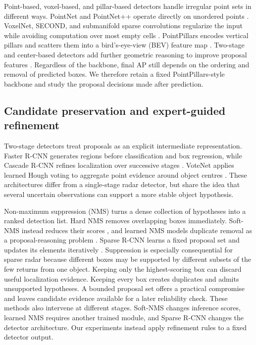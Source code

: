 \documentclass[sensors,article,submit,pdftex,moreauthors]{Definitions/mdpi}
\begin{document}
Point-based, voxel-based, and pillar-based detectors handle irregular point
sets in different ways. PointNet and PointNet++ operate directly on unordered
points \cite{qi2017pointnet,qi2017pointnetpp}. VoxelNet, SECOND, and submanifold
sparse convolutions regularize the input while avoiding computation over most
empty cells \cite{zhou2018voxelnet,yan2018second,graham2018submanifold}.
PointPillars encodes vertical pillars and scatters them into a bird's-eye-view
(BEV) feature map \cite{lang2019pointpillars}. Two-stage and center-based
detectors add further geometric reasoning to improve proposal features
\cite{shi2019pointrcnn,shi2020pvrcnn,yin2021centerpoint}. Regardless of the
backbone, final AP still depends on the ordering and removal of predicted boxes.
We therefore retain a fixed PointPillars-style backbone and study the proposal
decisions made after prediction.

\subsection{Candidate preservation and expert-guided refinement}

Two-stage detectors treat proposals as an explicit intermediate
representation. Faster R-CNN generates regions before classification and box
regression, while Cascade R-CNN refines localization over successive stages
\cite{ren2017fasterrcnn,cai2018cascadercnn}. VoteNet applies learned Hough
voting to aggregate point evidence around object centres
\cite{qi2019votenet}. These architectures differ from a single-stage radar
detector, but share the idea that several uncertain observations can support a
more stable object hypothesis.

Non-maximum suppression (NMS) turns a dense collection of hypotheses into a
ranked detection list. Hard NMS removes overlapping boxes immediately.
Soft-NMS instead reduces their scores \cite{bodla2017softnms}, and learned NMS
models duplicate removal as a proposal-reasoning problem
\cite{hosang2017learnnms}. Sparse R-CNN learns a fixed proposal set and updates
its elements iteratively \cite{sun2021sparsercnn}. Suppression is especially
consequential for sparse radar because different boxes may be supported by
different subsets of the few returns from one object. Keeping only the
highest-scoring box can discard useful localization evidence. Keeping every box
creates duplicates and admits unsupported hypotheses. A bounded proposal set
offers a practical compromise and leaves candidate evidence available for a
later reliability check. These methods also intervene at different stages.
Soft-NMS changes inference scores, learned NMS requires another trained module,
and Sparse R-CNN changes the detector architecture. Our experiments instead
apply refinement rules to a fixed detector output.
\end{document}
